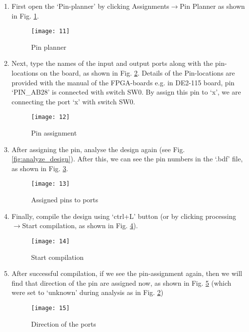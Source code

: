 \begin{enumerate}
	\item First open the `Pin-planner' by clicking Assignments$\rightarrow$Pin Planner as shown in Fig. \ref{fig:pin_planner}.
	
	\begin{figure}
		\centering
		\texttt{[image: 11]}
		\caption{Pin planner}
		\label{fig:pin_planner}
	\end{figure}
	
	\item Next, type the names of the input and output ports along with the pin-locations on the board, as shown in Fig. \ref{fig:pin_assgn}. Details of the Pin-locations are provided with the manual of the FPGA-boards e.g. in DE2-115 board, pin `PIN\_AB28' is connected with switch SW0. By assign this pin to `x', we are connecting the port `x' with switch SW0.
	
	\begin{figure}
		\centering
		\texttt{[image: 12]}
		\caption{Pin assignment}
		\label{fig:pin_assgn}
	\end{figure}
	
	\item After assigning the pin, analyse the design again (see Fig. \ref{fig:analyze_design}). After this, we can see the pin numbers in the `.bdf' file, as shown in Fig. \ref{fig:display_pin_assgn}.
	
	\begin{figure}
		\centering
		\texttt{[image: 13]}
		\caption{Assigned pins to ports}
		\label{fig:display_pin_assgn}
	\end{figure}
	
	\item Finally, compile the design using `ctrl+L' button (or by clicking processing$\rightarrow$Start compilation, as shown in Fig. \ref{fig:start_compilation}). 

	\begin{figure}
		\centering
		\texttt{[image: 14]}
		\caption{Start compilation}
		\label{fig:start_compilation}
	\end{figure}	
	
	\item After successful compilation, if we see the pin-assignment again, then we will find that direction of the pin are assigned now, as shown in Fig. \ref{fig:pin_assgn_direction} (which were set to `unknown' during analysis as in Fig. \ref{fig:pin_assgn})

		\begin{figure}[!h]
			\centering
			\texttt{[image: 15]}
			\caption{Direction of the ports}
			\label{fig:pin_assgn_direction}
		\end{figure}

\end{enumerate}

